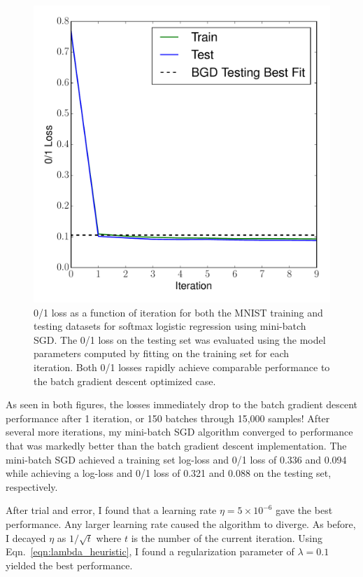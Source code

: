 \documentclass[12pt]{amsart}
\begin{document}
\begin{figure}[H]
	\includegraphics[width=\columnwidth]{sgd_mini_mnist_multi_train_test_01.pdf}
    \caption{0/1 loss as a function of iteration for both the MNIST training and testing datasets for softmax logistic regression using mini-batch SGD.  The 0/1 loss on the testing set was evaluated using the model parameters computed by fitting on the training set for each iteration.  Both 0/1 losses rapidly achieve comparable performance to the batch gradient descent optimized case.}
    \label{fig:sgd_mini_mnist_01}
\end{figure}

As seen in both figures, the losses immediately drop to the batch gradient descent performance after 1 iteration, or 150 batches through 15,000 samples!  After several more iterations, my mini-batch SGD algorithm converged to performance that was markedly better than the batch gradient descent implementation.  The mini-batch SGD achieved a training set log-loss and 0/1 loss of 0.336 and 0.094 while achieving a log-loss and 0/1 loss of 0.321 and 0.088 on the testing set, respectively.

After trial and error, I found that a learning rate $\eta = 5 \times 10^{-6}$ gave the best performance.  Any larger learning rate caused the algorithm to diverge.  As before, I decayed $\eta$ as $1/\sqrt{t}$ where $t$ is the number of the current iteration.  Using Eqn.~\ref{eqn:lambda_heuristic}, I found a regularization parameter of $\lambda = 0.1$ yielded the best performance.
\end{document}
